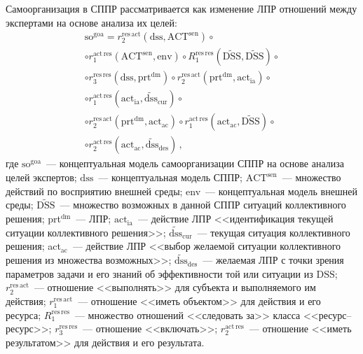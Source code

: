 \begin{multicols}{2}
  Самоорганизация в СППР рассматривается как изменение ЛПР отношений 
между экспертами на основе анализа их целей:
  \begin{multline*}
  \mathrm{so}^{\mathrm{goa}} = r_2^{\mathrm{res\,act}} (\mathrm{dss}, \mathrm{ACT}^{\mathrm{sen}})\circ \\
  \circ
r_1^{\mathrm{act\,res}}(\mathrm{ACT}^{\mathrm{sen}},\mathrm{env})\circ 
R_1^{\mathrm{\mathrm{res\,res}}}(\widetilde{\mathrm{DSS}},\widetilde{\mathrm{DSS}})\circ\\
  \circ  r_3^{\mathrm{res\,res}}(\mathrm{dss},\mathrm{prt}^{\mathrm{dm}})\circ 
  r_2^{\mathrm{res\,act}}(\mathrm{prt}^{\mathrm{dm}},\mathrm{act}_{\mathrm{ia}})\circ \\
  \circ
r_1^{\mathrm{act\,res}}(\mathrm{act}_{\mathrm{ia}},\widetilde{\mathrm{dss}}_{\mathrm{cur}})\circ\\
  \circ r_2^{\mathrm{res\,act}} (\mathrm{prt}^{\mathrm{dm}},\mathrm{act}_{\mathrm{ac}})\circ 
  r_1^{\mathrm{act\,res}}(\mathrm{act}_{\mathrm{ac}},\widetilde{\mathrm{DSS}})\circ \\
  \circ
r_2^{\mathrm{act\,res}} (\mathrm{act}_{\mathrm{ac}},\widetilde{\mathrm{dss}}_{\mathrm{des}})\,,
  \end{multline*}
где $\mathrm{so}^{\mathrm{goa}}$~--- концептуальная модель самоорганизации СППР на основе анализа 
целей экспертов; $\mathrm{dss}$~--- концептуальная модель СППР; $\mathrm{ACT}^{\mathrm{sen}}$~--- 
множество действий по восприятию внешней среды;   env~--- концептуальная 
модель внешней среды; $\widetilde{\mathrm{DSS}}$~--- множество возможных в данной СППР 
ситуаций коллективного решения; prt$^{\mathrm{dm}}$~--- ЛПР; $\mathrm{act}_{\mathrm{ia}}$~--- действие ЛПР 
<<идентификация текущей ситуации коллективного решения>>; 
$\widetilde{\mathrm{dss}}_{\mathrm{cur}}$~--- текущая ситуация коллективного решения; 
act$_{\mathrm{ac}}$~--- действие ЛПР <<выбор желаемой ситуации коллективного решения из 
множества возможных>>; $\widetilde{\mathrm{dss}}_{\mathrm{des}}$~--- желаемая ЛПР с точки зрения 
параметров задачи и его знаний об эффективности той или ситуации из $\mathrm{DSS}$; 
$r_2^{\mathrm{res\,act}}$~--- отношение <<выполнять>> для субъекта и выполняемого им 
действия; $r_1^{\mathrm{res\,act}}$~--- отношение <<иметь объектом>> для действия и его 
ресурса; $R_1^{\mathrm{res\,res}}$~--- множество отношений <<следовать за>> класса 
<<ре\-сурс--ре\-сурс>>; $r_3^{\mathrm{res\,res}}$~--- отношение <<включать>>; 
$r_2^{\mathrm{act\,res}}$~--- отношение <<иметь результатом>> для действия и его 
результата.
  

\end{multicols}
